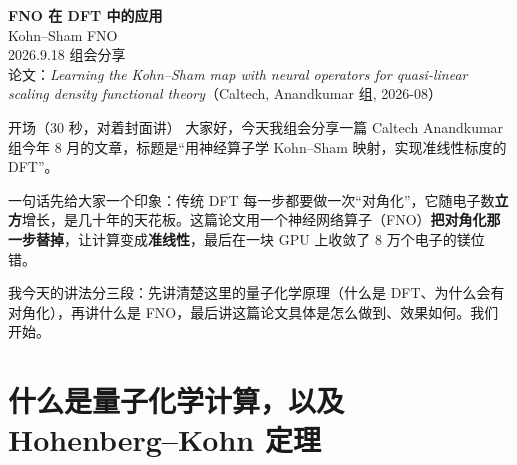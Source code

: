 \documentclass[11pt, a4paper, fontset=none]{ctexart}
\newcommand{\hl}[1]{{\color{key}\bfseries #1}}
\begin{document}
\begin{center}
  {\Huge\bfseries\color{accent} FNO 在 DFT 中的应用}\\[6pt]
  {\Large Kohn--Sham FNO}\\[10pt]
  {\normalsize 2026.9.18 组会分享}\\[4pt]
  {\small\color{gray} 论文：\textit{Learning the Kohn--Sham map with neural operators for quasi-linear scaling density functional theory}（Caltech, Anandkumar 组, 2026-08）}
\end{center}
\vspace{6pt}
\begin{say}{开场（30 秒，对着封面讲）}
大家好，今天我组会分享一篇 Caltech Anandkumar 组今年 8 月的文章，标题是“用神经算子学 Kohn--Sham 映射，实现准线性标度的 DFT”。

一句话先给大家一个印象：传统 DFT 每一步都要做一次“对角化”，它随电子数\hl{立方}增长，是几十年的天花板。这篇论文用一个神经网络算子（FNO）\hl{把对角化那一步替掉}，让计算变成\hl{准线性}，最后在一块 GPU 上收敛了 8 万个电子的镁位错。

我今天的讲法分三段：先讲清楚这里的量子化学原理（什么是 DFT、为什么会有对角化），再讲什么是 FNO，最后讲这篇论文具体是怎么做到、效果如何。我们开始。
\end{say}

\section{什么是量子化学计算，以及 Hohenberg–Kohn 定理}\label{sec:s2}
\end{document}

